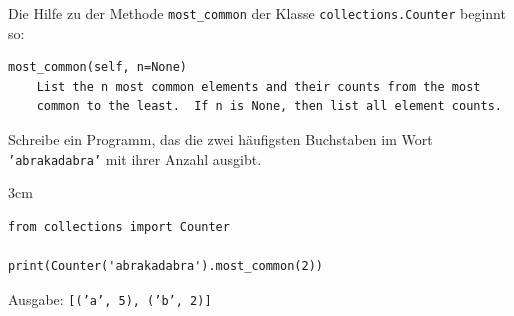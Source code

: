 \question[3]
Die Hilfe zu der Methode \texttt{most\_common} der Klasse \texttt{collections.Counter} beginnt so:
\begin{lstlisting}[language={}]
most_common(self, n=None)
    List the n most common elements and their counts from the most
    common to the least.  If n is None, then list all element counts.
\end{lstlisting}
Schreibe ein Programm, das die zwei häufigsten Buchstaben im Wort \texttt{'abrakadabra'} mit ihrer Anzahl ausgibt.
\begin{solutionbox}{3cm}
\begin{lstlisting}
from collections import Counter

print(Counter('abrakadabra').most_common(2))
\end{lstlisting}
Ausgabe: \texttt{[('a', 5), ('b', 2)]}
\end{solutionbox}
